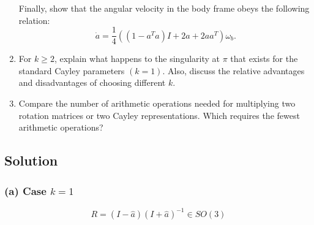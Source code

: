 \begin{enumerate}[label= (\alph*)]
          Finally, show that the angular velocity in the body frame obeys the following relation:
          \[
              \dot{a}=\frac{1}{4}\left(\left(1-a^{T} a\right) I+2 \widehat{a}+2 a a^{T}\right) \omega_{b} .
          \]

    \item For \( k \geq 2 \), explain what happens to the singularity at \( \pi \) that exists for the standard Cayley parameters \( (k=1) \).
          Also, discuss the relative advantages and disadvantages of choosing different \( k \).

    \item Compare the number of arithmetic operations needed for multiplying two rotation matrices or two Cayley representations.
          Which requires the fewest arithmetic operations?
\end{enumerate}

\subsection*{Solution}

\subsubsection*{(a) Case \( k=1 \)}

\begin{equation*}
    R = (I - \widehat{a}) {(I + \widehat{a})}^{-1} \in SO(3)
\end{equation*}
